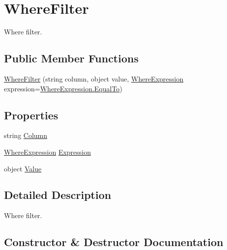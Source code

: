 \hypertarget{structOTA_1_1Data_1_1WhereFilter}{}\section{Where\+Filter}
\label{structOTA_1_1Data_1_1WhereFilter}


Where filter.  


\subsection*{Public Member Functions}
\begin{DoxyCompactItemize}
\item 
\hyperlink{structOTA_1_1Data_1_1WhereFilter_a41ea4ef468775e33e161f176944cc167}{Where\+Filter} (string column, object value, \hyperlink{namespaceOTA_1_1Data_a0a3d8ce6f0cb05b3e9b4641ea9464d9e}{Where\+Expression} expression=\hyperlink{namespaceOTA_1_1Data_a0a3d8ce6f0cb05b3e9b4641ea9464d9ea0242c502bd906e05171e64bad31c7c21}{Where\+Expression.\+Equal\+To})
\end{DoxyCompactItemize}
\subsection*{Properties}
\begin{DoxyCompactItemize}
\item 
string \hyperlink{structOTA_1_1Data_1_1WhereFilter_afb74a78088a803ae37ec43d79b696765}{Column}
\item 
\hyperlink{namespaceOTA_1_1Data_a0a3d8ce6f0cb05b3e9b4641ea9464d9e}{Where\+Expression} \hyperlink{structOTA_1_1Data_1_1WhereFilter_aa70e7c7b831f01bc4d211e5f12529eac}{Expression}
\item 
object \hyperlink{structOTA_1_1Data_1_1WhereFilter_a2d7e8cd2081ad3db5aa8e597557123e9}{Value}
\end{DoxyCompactItemize}


\subsection{Detailed Description}
Where filter. 



\subsection{Constructor \& Destructor Documentation}
\hypertarget{structOTA_1_1Data_1_1WhereFilter_a41ea4ef468775e33e161f176944cc167}{}
